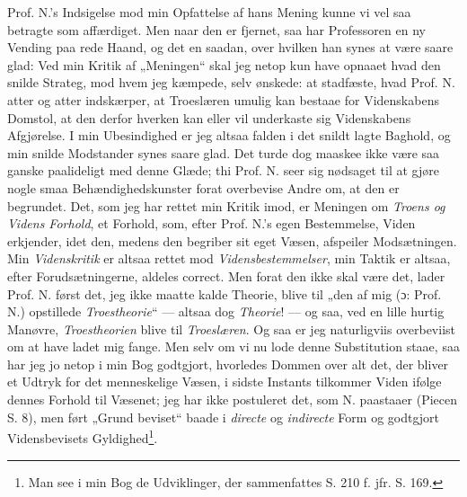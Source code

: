 \documentclass[12pt,a4paper]{book}
\newcommand{\opage}[1]{\marginnote{\footnotesize\textit{[#1]}}}
\begin{document}
Prof. N.'s Indsigelse mod min Opfattelse af hans Mening kunne vi vel saa betragte
som affærdiget. Men naar den er fjernet, saa har Professoren en ny Vending paa
rede Haand, og det en saadan, over hvilken han synes at være saare glad: Ved min
Kritik af „Meningen“ skal jeg netop kun have opnaaet hvad den snilde Strateg, mod
hvem jeg kæmpede, selv ønskede: at stadfæste, hvad Prof. N. atter og atter
indskærper, at Troeslæren umulig kan bestaae for Videnskabens Domstol, at den
derfor hverken kan eller vil underkaste sig Videnskabens Afgjørelse. I min
Ubesindighed er jeg altsaa falden i det snildt lagte Baghold, og min snilde
Modstander synes saare glad. Det turde dog maaskee ikke være saa ganske
paalideligt med denne Glæde; thi Prof. N. seer sig nødsaget til at gjøre nogle
smaa Behændighedskunster forat overbevise Andre om, at den er begrundet. Det,
som jeg har rettet min Kritik imod, er Meningen om \emph{Troens og Videns
Forhold}, et Forhold, som, efter Prof. N.'s egen Bestemmelse, Viden erkjender,
idet den, medens den begriber sit eget Væsen, afspeiler Modsætningen. Min
\emph{Videnskritik} er altsaa rettet mod \emph{Vidensbestemmelser}, min Taktik
er altsaa, efter Forudsætningerne, aldeles correct. Men forat den ikke skal være
det, lader Prof. N. først det, jeg ikke maatte kalde Theorie, blive til „den af
mig (ɔ: Prof. N.) opstillede \emph{Troestheorie}“ --- altsaa dog
\emph{Theorie}! --- og saa, ved en lille hurtig Manøvre, \emph{Troestheorien}
blive til \emph{Troeslæren}.
Og saa er jeg naturligviis overbeviist om at have ladet mig fange. Men selv om
vi nu lode denne Substitution staae, saa har jeg jo netop i min Bog godtgjort,
hvorledes Dommen over alt det, der bliver et Udtryk for det menneskelige Væsen,
i sidste Instants tilkommer Viden ifølge dennes Forhold til Væsenet; jeg har
ikke postuleret det, som N. paastaaer (Piecen S. 8), men ført „Grund\-%
\opage{9}%
\setcounter{footnote}{0}%
beviset“ baade i \emph{directe} og \emph{indirecte} Form og godtgjort
Vidensbevisets Gyldighed\footnote{%
  Man see i min Bog de Udviklinger, der sammenfattes S. 210 f. jfr. S. 169.}.
\end{document}
